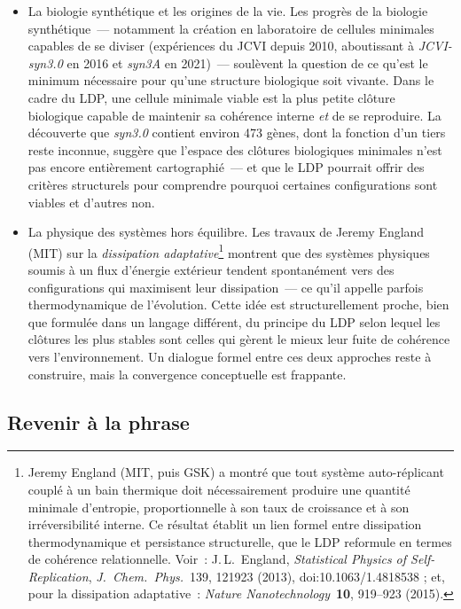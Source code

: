 \documentclass[12pt, a4paper, openright]{book}
\begin{document}
\begin{itemize}
\item La biologie synthétique et les origines de la vie. Les progrès de la biologie synthétique~--- notamment la création en laboratoire de cellules minimales capables de se diviser (expériences du JCVI depuis 2010, aboutissant à \textit{JCVI-syn3.0} en 2016 et \textit{syn3A} en 2021)~--- soulèvent la question de ce qu'est le minimum nécessaire pour qu'une structure biologique soit \og vivante\fg{}. Dans le cadre du LDP, une cellule minimale viable est la plus petite clôture biologique capable de maintenir sa cohérence interne \emph{et} de se reproduire. La découverte que \textit{syn3.0} contient environ 473 gènes, dont la fonction d'un tiers reste inconnue, suggère que l'espace des clôtures biologiques minimales n'est pas encore entièrement cartographié~--- et que le LDP pourrait offrir des critères structurels pour comprendre pourquoi certaines configurations sont viables et d'autres non.

\item La physique des systèmes hors équilibre. Les travaux de Jeremy England (MIT) sur la \emph{dissipation adaptative}\footnote{Jeremy England (MIT, puis GSK) a montré que tout système auto-réplicant couplé à un bain thermique doit nécessairement produire une quantité minimale d'entropie, proportionnelle à son taux de croissance et à son irréversibilité interne. Ce résultat établit un lien formel entre dissipation thermodynamique et persistance structurelle, que le LDP reformule en termes de cohérence relationnelle. Voir~: J.\,L.~England, \textit{Statistical Physics of Self-Replication}, \textit{J.~Chem.~Phys.}~139, 121923 (2013), doi:10.1063/1.4818538 ; et, pour la dissipation adaptative~: \textit{Nature Nanotechnology}~\textbf{10}, 919--923 (2015).} montrent que des systèmes physiques soumis à un flux d'énergie extérieur tendent spontanément vers des configurations qui maximisent leur dissipation~--- ce qu'il appelle parfois \og thermodynamique de l'évolution\fg{}. Cette idée est structurellement proche, bien que formulée dans un langage différent, du principe du LDP selon lequel les clôtures les plus stables sont celles qui gèrent le mieux leur fuite de cohérence vers l'environnement. Un dialogue formel entre ces deux approches reste à construire, mais la convergence conceptuelle est frappante.

\end{itemize}

\subsection*{Revenir à la phrase}
\end{document}
